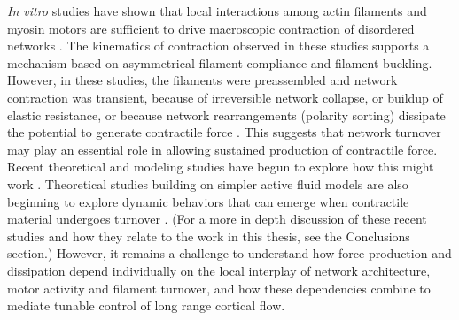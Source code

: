 {\em In vitro} studies have shown that local interactions among actin filaments and myosin motors are sufficient to drive macroscopic contraction of disordered networks \cite{rheo_2D1}.  The kinematics of contraction observed in these studies supports a mechanism based on asymmetrical filament compliance and filament buckling.  However, in these studies, the filaments were preassembled and network contraction was transient, because of irreversible network collapse\cite{Alvarado:2013aa}, or buildup of elastic resistance\cite{Murrell15062014}, or because network rearrangements (polarity sorting) dissipate the potential to generate contractile force \cite{Ennomani2016616, Reymann1310, Ndlec:1997aa,Surrey1167}. This suggests that network turnover may play an essential role in allowing sustained production of contractile force. Recent theoretical and modeling studies have begun to explore how this might work \cite{2015arXiv150706182H, Mak:2016aa, 10.1371/journal.pone.0000696}. Theoretical studies building on simpler active fluid models are also beginning to explore dynamic behaviors that can emerge when contractile material undergoes turnover \cite{PhysRevLett.103.058102,PhysRevLett.113.148102}. (For a more in depth discussion of these recent studies and how they relate to the work in this thesis, see the Conclusions section.) However, it remains a challenge to understand how force production and dissipation depend individually on the local interplay of network architecture, motor activity and filament turnover, and how these dependencies combine to mediate tunable control of long range cortical flow. 



